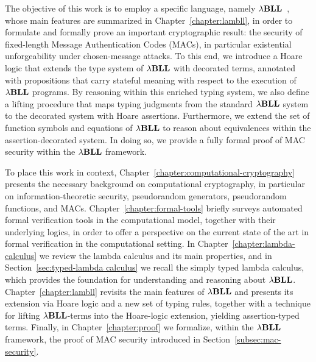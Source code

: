 The objective of this work is to employ a specific language, namely ${\lambda}\mathbf{BLL}$~\cite{lago2024computationalindistinguishabilitylogicalrelations}, whose main features are summarized in Chapter~\ref{chapter:lambll}, in order to formulate and formally prove an important cryptographic result: the security of fixed-length Message Authentication Codes (MACs), in particular existential unforgeability under chosen-message attacks. To this end, we introduce a Hoare logic that extends the type system of ${\lambda}\mathbf{BLL}$ with decorated terms, annotated with propositions that carry stateful meaning with respect to the execution of ${\lambda}\mathbf{BLL}$ programs. By reasoning within this enriched typing system, we also define a lifting procedure that maps typing judgments from the standard ${\lambda}\mathbf{BLL}$ system to the decorated system with Hoare assertions. Furthermore, we extend the set of function symbols and equations of ${\lambda}\mathbf{BLL}$ to reason about equivalences within the assertion-decorated system. In doing so, we provide a fully formal proof of MAC security within the ${\lambda}\mathbf{BLL}$ framework.

To place this work in context, Chapter~\ref{chapter:computational-cryptography} presents the necessary background on computational cryptography, in particular on information-theoretic security, pseudorandom generators, pseudorandom functions, and MACs. Chapter~\ref{chapter:formal-tools} briefly surveys automated formal verification tools in the computational model, together with their underlying logics, in order to offer a perspective on the current state of the art in formal verification in the computational setting. In Chapter~\ref{chapter:lambda-calculus} we review the lambda calculus and its main properties, and in Section~\ref{sec:typed-lambda calculus} we recall the simply typed lambda calculus, which provides the foundation for understanding and reasoning about ${\lambda}\mathbf{BLL}$. Chapter~\ref{chapter:lambll} revisits the main features of ${\lambda}\mathbf{BLL}$ and presents its extension via Hoare logic and a new set of typing rules, together with a technique for lifting ${\lambda}\mathbf{BLL}$-terms into the Hoare-logic extension, yielding assertion-typed terms. Finally, in Chapter~\ref{chapter:proof} we formalize, within the ${\lambda}\mathbf{BLL}$ framework, the proof of MAC security introduced in Section~\ref{subsec:mac-security}.